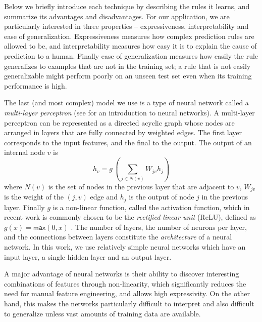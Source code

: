 Below we briefly introduce each technique by describing the rules it learns, and
summarize its advantages and disadvantages. For our application, we are
particularly interested in three properties -- expressiveness, interpretability
and ease of generalization. Expressiveness measures how complex prediction rules
are allowed to be, and interpretability measures how easy it is to explain the
cause of prediction to a human. Finally ease of generalization measures how
easily the rule generalizes to examples that are not in the training set; a rule
that is not easily generalizable might perform poorly on an unseen test set even
when its training performance is high.


The last (and most complex) model we use is a type of neural network called a
\emph{multi-layer perceptron} (see \citealt{Nielsen2015-pu} for an introduction
to neural networks). A multi-layer perceptron can be represented as a directed
acyclic graph whose nodes are arranged in layers that are fully connected by
weighted edges. The first layer corresponds to the input features, and the final
to the output.
The output of an internal node $v$ is
\[ h_v = g\,(\sum_{j \in N(v)}\!W_{jv} h_j ) \] where $N(v)$ is the set of nodes
in the previous layer that are adjacent to $v$, $W_{jv}$ is the weight of the
$(j, v)$ edge and $h_j$ is the output of node $j$ in the previous layer. Finally
$g$ is a non-linear function, called the activation function, which in recent
work is commonly chosen to be the \emph{rectified linear unit} (ReLU), defined
as $g(x) = \mathsf{max}(0,x)$ \citep{Nair2010-xg}. The number of layers, the
number of neurons per layer, and the connections between layers constitute the
\emph{architecture} of a neural network. In this work, we use relatively simple
neural networks which have an input layer, a single hidden layer and an output
layer.

A major advantage of neural networks is their ability to discover interesting
combinations of features through non-linearity, which significantly reduces the
need for manual feature engineering, and allows high expressivity. On the other
hand, this makes the networks particularly difficult to interpret and also
difficult to generalize unless vast amounts of training data are available.


\lstMakeShortInline{|}
